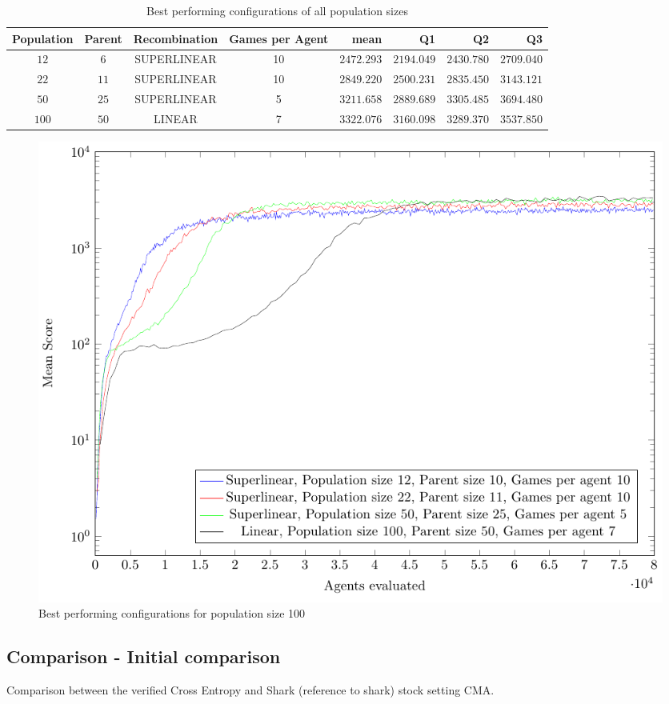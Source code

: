 \begin{table}[H]
\centering
\small
\begin{tabular}{c c c c r r r r}
Population & Parent & Recombination & Games per Agent & mean & Q1 & Q2 & Q3\\
\hline
$12$ & $6$ & SUPERLINEAR & 10 & $2472.293$ & $2194.049$ & $2430.780$ & $2709.040$\\
$22$ & $11$ & SUPERLINEAR & 10 & $2849.220$ & $2500.231$ & $2835.450$ & $3143.121$\\
$50$ & $25$ & SUPERLINEAR & 5 & $3211.658$ & $2889.689$ & $3305.485$ & $3694.480$\\
$100$ & $50$ & LINEAR & 7 & $3322.076$ & $3160.098$ & $3289.370$ & $3537.850$\\
\end{tabular}
\caption{Best performing configurations of all population sizes}
\end{table}

\begin{figure}[H]
\centering
\caption{Best performing configurations for population size 100}
\includegraphics[scale=1]{data/cma_population_offspring/bestofall_population/PlotFile.pdf}
\end{figure}



\clearpage

\subsection{Comparison - Initial comparison}
Comparison between the verified Cross Entropy and Shark (reference to shark) stock setting CMA.

